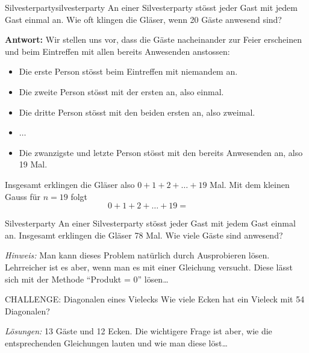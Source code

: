 \begin{bsp}{Silvesterparty}{silvesterparty}
    An einer Silvesterparty stösst jeder Gast mit jedem Gast einmal an. Wie oft klingen die Gläser, wenn 20 Gäste anwesend sind?

    \textbf{Antwort:} Wir stellen uns vor, dass die Gäste nacheinander zur Feier erscheinen und beim Eintreffen mit allen bereits Anwesenden anstossen:
    \begin{itemize}
        \item Die erste Person stösst beim Eintreffen mit niemandem an.
        \item Die zweite Person stösst mit der ersten an, also einmal.
        \item Die dritte Person stösst mit den beiden ersten an, also zweimal.
        \item \(\dots\)
        \item Die zwanzigste und letzte Person stösst mit den bereits Anwesenden an, also 19 Mal.
    \end{itemize}

    Insgesamt erklingen die Gläser also \(0+1+2+\dots+19\) Mal. Mit dem kleinen Gauss für \(n=19\) folgt
    \[
        0+1+2+\dots+19
        =\qquad
    \]


\end{bsp}

\begin{ueb}{Silvesterparty}{}
    An einer Silvesterparty stösst jeder Gast mit jedem Gast einmal an. Insgesamt erklingen die Gläser 78 Mal. Wie viele Gäste sind anwesend?

    \emph{Hinweis:} Man kann dieses Problem natürlich durch Ausprobieren lösen. Lehrreicher ist es aber, wenn man es mit einer Gleichung versucht. Diese lässt sich mit der Methode \enquote{Produkt = 0} lösen\dots
\end{ueb}

\begin{ueb}{CHALLENGE: Diagonalen eines Vielecks}{}
    Wie viele Ecken hat ein Vieleck mit 54 Diagonalen?
\end{ueb}


\emph{Lösungen:} 13 Gäste und 12 Ecken. Die wichtigere Frage ist aber, wie die entsprechenden Gleichungen lauten und wie man diese löst\dots




